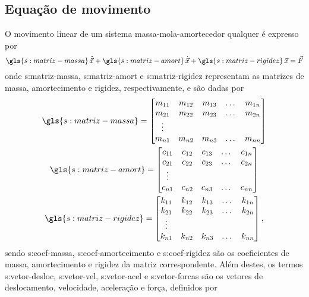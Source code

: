 \documentclass[12pt,oneside,english,brazil,lmodern,siglas,simbolos,cite=num]{ucsmonograph}
\begin{document}
	\subsection{Equação de movimento}
	O movimento linear de um sistema massa-mola-amortecedor qualquer é expresso por \cite{rao:2008}
	\begin{equation} \label{eqn:discr:movimento}
		\gls{s:matriz-massa}\,\ddot{\vec{x}} + \gls{s:matriz-amort}\,\dot{\vec{x}} + \gls{s:matriz-rigidez}\,\vec{x} = \vec{F}
	\end{equation}
	onde \gls{s:matriz-massa}, \gls{s:matriz-amort} e \gls{s:matriz-rigidez} representam as matrizes de massa, amortecimento e rigidez, respectivamente, e são dadas por
	\begin{gather} 
		\gls{s:matriz-massa} = 
		\begin{bmatrix} \label{eqn:matr:massa}
			m_{11} & m_{12} & m_{13} & \dots & m_{1n}\\
			m_{21} & m_{22} & m_{23} & \dots & m_{2n}\\
			\vdots\\
			m_{n1} & m_{n2} & m_{n3} & \dots & m_{nn}\\
		\end{bmatrix}\\
		\gls{s:matriz-amort} = 
		\begin{bmatrix} \label{eqn:matr:amort}
			c_{11} & c_{12} & c_{13} & \dots & c_{1n}\\
			c_{21} & c_{22} & c_{23} & \dots & c_{2n}\\
			\vdots\\
			c_{n1} & c_{n2} & c_{n3} & \dots & c_{nn}\\
		\end{bmatrix}\\
		\gls{s:matriz-rigidez} =
		\begin{bmatrix} \label{eqn:matr:rigid}
			k_{11} & k_{12} & k_{13} & \dots & k_{1n}\\
			k_{21} & k_{22} & k_{23} & \dots & k_{2n}\\
			\vdots\\
			k_{n1} & k_{n2} & k_{n3} & \dots & k_{nn}\\
		\end{bmatrix},
	\end{gather}
	sendo \gls{s:coef-massa}, \gls{s:coef-amortecimento} e \gls{s:coef-rigidez} são os coeficientes de massa, amortecimento e rigidez da matriz correspondente.	Além destes, os termos \gls{s:vetor-desloc}, \gls{s:vetor-vel}, \gls{s:vetor-acel} e \gls{s:vetor-forcas} são os vetores de deslocamento, velocidade, aceleração e força, definidos por \cite{rao:2008}
\end{document}
